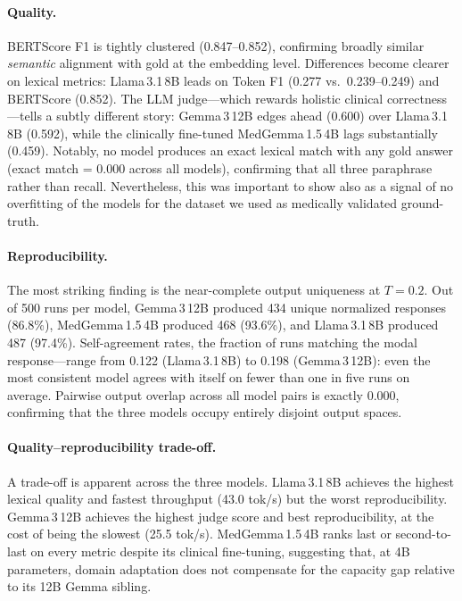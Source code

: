 \documentclass[11pt,twocolumn]{article}
\begin{document}
\paragraph{Quality.}
BERTScore F1 is tightly clustered (0.847--0.852), confirming broadly
similar \emph{semantic} alignment with gold at the embedding level.
Differences become clearer on lexical metrics:
Llama\,3.1\,8B leads on Token F1 (0.277 vs.\ 0.239--0.249) and
BERTScore (0.852).
The LLM judge---which rewards holistic clinical correctness---tells
a subtly different story: Gemma\,3\,12B edges ahead (0.600) over
Llama\,3.1\,8B (0.592), while the clinically fine-tuned
MedGemma\,1.5\,4B lags substantially (0.459).
Notably, no model produces an exact lexical match with any gold
answer (exact match = 0.000 across all models), confirming that
all three paraphrase rather than recall. Nevertheless, this was important
to show also as a signal of no overfitting of the models for the dataset
we used as medically validated ground-truth. 

\paragraph{Reproducibility.}
The most striking finding is the near-complete output uniqueness at
$T{=}0.2$.
Out of 500 runs per model, Gemma\,3\,12B produced 434 unique
normalized responses (86.8\%), MedGemma\,1.5\,4B produced 468
(93.6\%), and Llama\,3.1\,8B produced 487 (97.4\%).
Self-agreement rates, the fraction of runs matching the modal
response---range from 0.122 (Llama\,3.1\,8B) to 0.198
(Gemma\,3\,12B): even the most consistent model agrees with itself
on fewer than one in five runs on average.
Pairwise output overlap across all model pairs is exactly 0.000,
confirming that the three models occupy entirely disjoint output spaces.

\paragraph{Quality--reproducibility trade-off.}
A trade-off is apparent across the three models.
Llama\,3.1\,8B achieves the highest lexical quality and fastest
throughput (43.0 tok/s) but the worst reproducibility.
Gemma\,3\,12B achieves the highest judge score and best
reproducibility, at the cost of being the slowest (25.5 tok/s).
MedGemma\,1.5\,4B ranks last or second-to-last on every metric
despite its clinical fine-tuning, suggesting that, at 4B parameters,
domain adaptation does not compensate for the capacity gap relative
to its 12B Gemma sibling.
\end{document}
